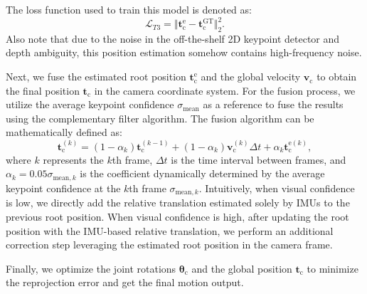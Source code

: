 %
The loss function used to train this model is denoted as:
\begin{equation}
\mathcal{L}_{T3}=\Vert \boldsymbol{t}_{\mathrm{c}}^{\mathrm{e}}-\boldsymbol{t}_\mathrm{c}^{\mathrm{GT}} \Vert_2^{2}.
\end{equation}
Also note that due to the noise in the off-the-shelf 2D keypoint detector and depth ambiguity, this position estimation somehow contains high-frequency noise.
%
\par
%
Next, we fuse the estimated root position $\boldsymbol{t}_{\mathrm{c}}^{\mathrm{e}}$ and the global velocity $\boldsymbol{{v}_{\mathrm{c}}}$ to obtain the final position $\boldsymbol{{t}_{\mathrm{c}}}$ in the camera coordinate system.
%
For the fusion process, we utilize the average keypoint confidence $\sigma_{\mathrm{mean}}$ as a reference to fuse the results using the complementary filter algorithm.
%
%
%
The fusion algorithm can be mathematically defined as:
%
\begin{equation}
    \boldsymbol{t}_{\mathrm{c}}^{(k)} = (1-\alpha_k)\boldsymbol{t}_{\mathrm{c}}^{(k-1)} + (1-\alpha_k)\boldsymbol{v}_{\mathrm{c}}^{(k)}\Delta t + \alpha_k\boldsymbol{t}_{\mathrm{c}}^{\mathrm{e}(k)},
\end{equation}
%
where $k$ represents the $k$th frame, $\Delta t$ is the time interval between frames, and $\alpha_k=0.05\sigma_{\mathrm{mean},k}$ is the coefficient dynamically determined by the average keypoint confidence at the $k$th frame $\sigma_{\mathrm{mean},k}$.
%
Intuitively, when visual confidence is low, we directly add the relative translation estimated solely by IMUs to the previous root position.
%
When visual confidence is high, after updating the root position with the IMU-based relative translation, we perform an additional correction step leveraging the estimated root position in the camera frame.
\par
%
Finally, we optimize the joint rotations $\boldsymbol{\theta}_{\mathrm{c}}$ and the global position $\boldsymbol{t}_{\mathrm{c}}$ to minimize the reprojection error and get the final motion output.
